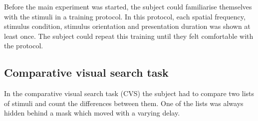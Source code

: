 Before the main experiment was started, the subject could familiarise themselves with the stimuli in a training protocol. In this protocol, each spatial frequency, stimulus condition, stimulus orientation and presentation duration was shown at least once. The subject could repeat this training until they felt comfortable with the protocol. 

\vspace{5mm}
\subsection{Comparative visual search task}

In the comparative visual search task (CVS) the subject had to compare two lists of stimuli and count the differences between them. One of the lists was always hidden behind a mask which moved with a varying delay. 

